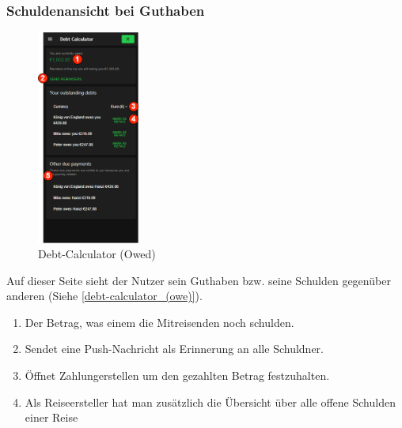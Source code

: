 \subsubsection{Schuldenansicht bei Guthaben}\label{debt-calculator_(owed)}
\begin{figure}[H]
    \centering
    \includegraphics[width=0.3\textwidth]{img/pages_numbers/debt-calculator_(owed).drawio}
    \caption[Debt-Calculator (Owed)]{Debt-Calculator (Owed)}
    \label{fig:debt-calculator_(owed)}
\end{figure}
Auf dieser Seite sieht der Nutzer sein Guthaben bzw. seine Schulden gegenüber anderen (Siehe \ref{debt-calculator_(owe)}).
\begin{enumerate}[label=\protect\circled{\arabic*}]
	\item Der Betrag, was einem die Mitreisenden noch schulden.
	\item Sendet eine Push-Nachricht als Erinnerung an alle Schuldner.
	\item Öffnet Zahlungerstellen um den gezahlten Betrag festzuhalten.
	\item Als Reiseersteller hat man zusätzlich die Übersicht über alle offene Schulden einer Reise
\end{enumerate}

